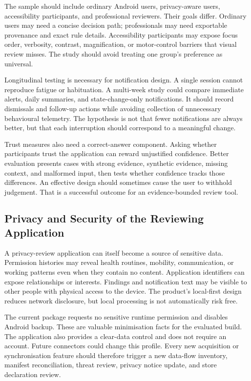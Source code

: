 The sample should include ordinary Android users, privacy-aware users, accessibility participants, and professional reviewers. Their goals differ. Ordinary users may need a concise decision path; professionals may need exportable provenance and exact rule details. Accessibility participants may expose focus order, verbosity, contrast, magnification, or motor-control barriers that visual review misses. The study should avoid treating one group's preference as universal.

Longitudinal testing is necessary for notification design. A single session cannot reproduce fatigue or habituation. A multi-week study could compare immediate alerts, daily summaries, and state-change-only notifications. It should record dismissals and follow-up actions while avoiding collection of unnecessary behavioural telemetry. The hypothesis is not that fewer notifications are always better, but that each interruption should correspond to a meaningful change.

Trust measures also need a correct-answer component. Asking whether participants trust the application can reward unjustified confidence. Better evaluation presents cases with strong evidence, synthetic evidence, missing context, and malformed input, then tests whether confidence tracks those differences. An effective design should sometimes cause the user to withhold judgement. That is a successful outcome for an evidence-bounded review tool.

\subsection{Privacy and Security of the Reviewing Application}

A privacy-review application can itself become a source of sensitive data. Permission histories may reveal health routines, mobility, communication, or working patterns even when they contain no content. Application identifiers can expose relationships or interests. Findings and notification text may be visible to other people with physical access to the device. The product's local-first design reduces network disclosure, but local processing is not automatically risk free.

The current package requests no sensitive runtime permission and disables Android backup. These are valuable minimisation facts for the evaluated build. The application also provides a clear-data control and does not require an account. Future connectors could change this profile. Every new acquisition or synchronisation feature should therefore trigger a new data-flow inventory, manifest reconciliation, threat review, privacy notice update, and store declaration review.


